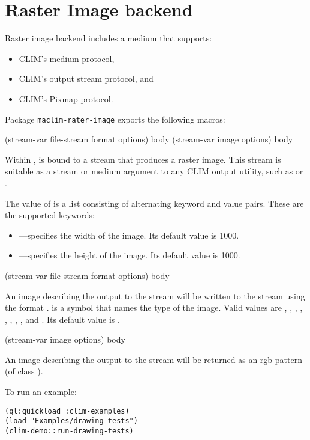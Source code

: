 \chapter{Raster Image backend}
Raster image backend includes a medium that supports:
\begin{itemize}
\item CLIM's medium protocol, 
\item CLIM's output stream protocol, and
\item CLIM's Pixmap protocol.
\end{itemize}

Package \texttt{maclim-rater-image} exports the following macros:

 {(stream-var file-stream format \rest options) \body body}
 {(stream-var image \rest options) \body body}

Within ,  is bound to a stream that produces
a raster image.  This stream is suitable as a stream or medium argument to any
CLIM output utility, such as  or .  

The value of  is a list consisting of alternating keyword and value
pairs.  These are the supported keywords:
\begin{itemize}
\item {}---specifies the width of the image. Its default value is 1000.
\item {}---specifies the height of the image. Its default value is 1000. 
\end{itemize}

 {(stream-var file-stream format \rest options) \body body}

An image describing the output to the  stream will be written to the stream  using the format .  is a symbol that names the type of the image. Valid values are , , , , , , , , and . Its default value is .

 {(stream-var image \rest options) \body body}

An image describing the output to the  stream will be returned as an rgb-pattern (of class ).


To run an example:
\begin{verbatim}
(ql:quickload :clim-examples)
(load "Examples/drawing-tests")
(clim-demo::run-drawing-tests)
\end{verbatim}





